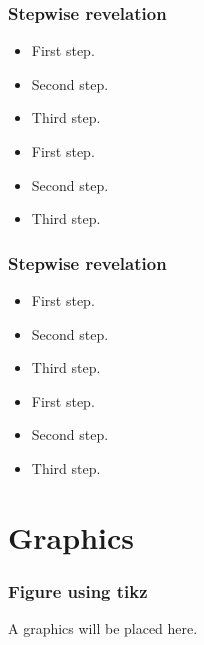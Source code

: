\documentclass[11pt]{beamer}
\begin{document}
\begin{frame}
  \frametitle{Stepwise revelation}
  \begin{minipage}{.45\linewidth}
    \begin{itemize}
    \item<1-> First step.
    \item<2-> Second step.
    \item<3-> Third step.
    \end{itemize}
  \end{minipage}
  \begin{minipage}{.45\linewidth}
    \begin{itemize}
    \item<1-> First step.
    \item<2-> Second step.
    \item<3-> Third step.
    \end{itemize}
  \end{minipage}
\end{frame}

\begin{frame}
  \frametitle{Stepwise revelation}
  \begin{minipage}{.45\linewidth}
    \begin{itemize}[<+->]
    \item First step.
    \item Second step.
    \item Third step.
    \end{itemize}
  \end{minipage}
  \begin{minipage}{.45\linewidth}
    \begin{itemize}[<+- | alert@+>]
    \item First step.
    \item Second step.
    \item Third step.
    \end{itemize}
  \end{minipage}
\end{frame}

\section{Graphics}
\begin{frame}
  \frametitle{Figure using tikz}
  \begin{center}
    A graphics will be placed here.
  \end{center}
\end{frame}
\end{document}
